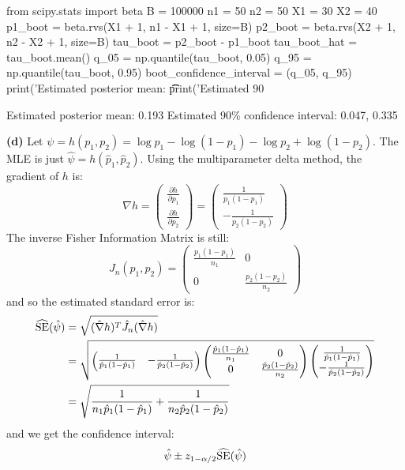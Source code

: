 \begin{python}
from scipy.stats import beta
B = 100000
n1 = 50
n2 = 50
X1 = 30
X2 = 40
p1_boot = beta.rvs(X1 + 1, n1 - X1 + 1, size=B)
p2_boot = beta.rvs(X2 + 1, n2 - X2 + 1, size=B)
tau_boot = p2_boot - p1_boot
tau_boot_hat = tau_boot.mean()
q_05 = np.quantile(tau_boot, 0.05)
q_95 = np.quantile(tau_boot, 0.95)
boot_confidence_interval = (q_05, q_95)
print('Estimated posterior mean: \t\t %
print('Estimated 90%
\end{python}
\begin{console}
Estimated posterior mean:                0.193
Estimated 90\% confidence interval:       0.047, 0.335
\end{console}
\textbf{(d)}
Let
\(\psi = h(p_{1}, p_{2}) = \log p_{1} - \log (1 - p_{1}) - \log p_{2} + \log (1 - p_{2})\).
The MLE is just \(\hat{\psi} = h(\hat{p}_{1}, \hat{p}_{2})\).
Using the multiparameter delta method, the gradient of \(h\) is:
\[
\nabla h = 
\begin{pmatrix}
\frac{\partial h}{\partial p_{1}} \\ 
\frac{\partial h}{\partial p_{2}} \end{pmatrix}
= \begin{pmatrix}
\frac{1}{p_{1}(1 - p_{1})} \\
-\frac{1}{p_{2}(1 - p_{2})}
\end{pmatrix}
\]
The inverse Fisher Information Matrix is still:
\[
J_{n}(p_{1}, p_{2}) = \begin{pmatrix}
\frac{p_{1}(1 - p_{1})}{n_{1}} & 0 \\
0 & \frac{p_{2}(1 - p_{2})}{n_{2}}
\end{pmatrix}
\]
and so the estimated standard error is:
\begin{align*}
\widehat{\operatorname{\mathrm{SE}}}(\hat{\psi}) &= \sqrt{(\hat{\nabla}h)^T \hat{J}_{n} (\hat{\nabla}h)} \\
&= 
\sqrt{\begin{pmatrix}
\frac{1}{\hat{p}_{1}(1 - \hat{p}_{1})} &
-\frac{1}{\hat{p}_{2}(1 - \hat{p}_{2})}
\end{pmatrix}
\begin{pmatrix}
\frac{\hat{p}_{1}(1 - \hat{p}_{1})}{n_{1}} & 0 \\
0 & \frac{\hat{p}_{2}(1 - \hat{p}_{2})}{n_{2}}
\end{pmatrix}
\begin{pmatrix}
\frac{1}{\hat{p}_{1}(1 - \hat{p}_{1})} \\
-\frac{1}{\hat{p}_{2}(1 - \hat{p}_{2})}
\end{pmatrix}} \\
&= \sqrt{\frac{1}{n_{1} \hat{p}_{1}(1 - \hat{p}_{1})} + \frac{1}{n_{2} \hat{p}_{2}(1 - \hat{p}_{2})}}
\end{align*}
and we get the confidence interval:
\[
\hat{\psi} \pm z_{1 - \alpha/2} \widehat{\operatorname{\mathrm{SE}}}(\hat{\psi})
\]

